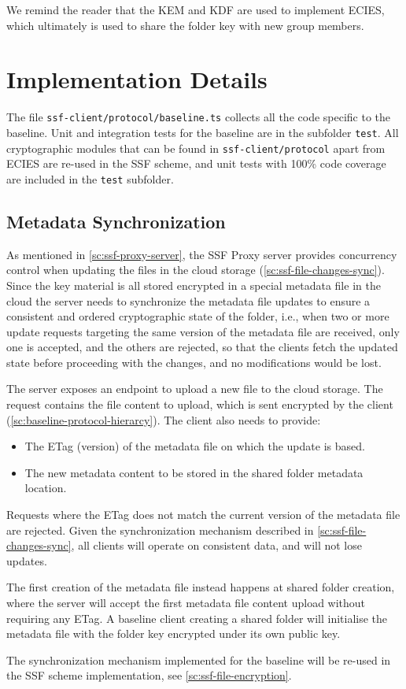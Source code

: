 We remind the reader that the KEM and KDF are used to
implement ECIES, which ultimately is used to
share the folder key with new group members.

\section{Implementation Details}\label{sc:baseline-protocol}

The file \texttt{ssf-client/protocol/baseline.ts} collects all the code specific to the baseline.
Unit and integration tests for the baseline are in the subfolder \texttt{test}.
All cryptographic modules that can be found in
\texttt{ssf-client/protocol} apart from ECIES are re-used in the SSF scheme,
and unit tests with 100\% code coverage are included in the
\texttt{test} subfolder.

\subsection{Metadata Synchronization}\label{sc:metadata-synchronization}

As mentioned in \cref{sc:ssf-proxy-server}, the
SSF Proxy server provides concurrency control
when updating the files in the cloud storage (\cref{sc:ssf-file-changes-sync}).
Since the key material is all stored encrypted in a special metadata file
in the cloud
the server needs to synchronize the metadata file updates
to ensure a consistent and ordered cryptographic state of the folder,
i.e., when two or more update requests targeting the same version of the metadata file are received, only one is
accepted, and the others are rejected, so that the
clients fetch the updated state before proceeding
with the changes, and no modifications would be lost.

The server exposes an endpoint to upload a new file
to the cloud storage. The request contains the file
content to upload, which is sent encrypted by the client
(\cref{sc:baseline-protocol-hierarcy}). The client
also needs to provide:
\begin{itemize}
    \item The ETag (version) of the metadata file on which the update is based.
    \item The new metadata content to be stored in the shared folder metadata location.
\end{itemize}
Requests where the ETag does not match the current version
of the metadata file are rejected. Given the
synchronization mechanism described in \cref{sc:ssf-file-changes-sync},
all clients will operate on consistent data, and
will not lose updates.

The first creation of the metadata file instead happens
at shared folder creation, where the server will
accept the first metadata file content upload
without requiring any ETag. A baseline client
creating a shared folder will initialise the metadata
file with the folder key encrypted under its own
public key.

The synchronization mechanism implemented
for the baseline will be re-used in the SSF scheme
implementation, see \cref{sc:ssf-file-encryption}.
